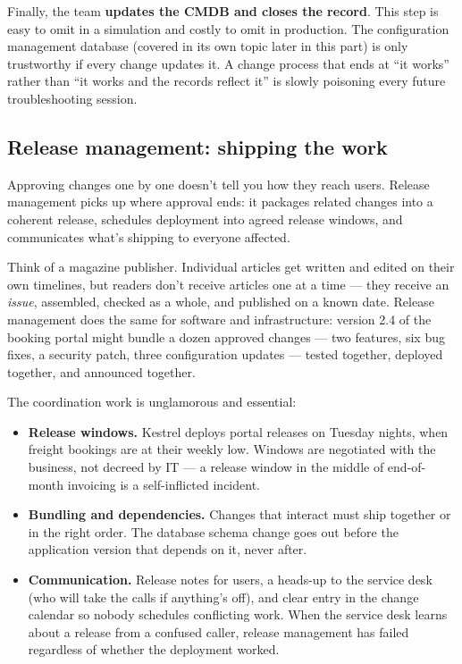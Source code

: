 Finally, the team \textbf{updates the CMDB and closes the record}. This step is easy to omit in a simulation and costly to omit in production. The configuration management database (covered in its own topic later in this part) is only trustworthy if every change updates it. A change process that ends at ``it works'' rather than ``it works and the records reflect it'' is slowly poisoning every future troubleshooting session.



\subsection{Release management: shipping the work}


Approving changes one by one doesn't tell you how they reach users. Release management picks up where approval ends: it packages related changes into a coherent release, schedules deployment into agreed release windows, and communicates what's shipping to everyone affected.


Think of a magazine publisher. Individual articles get written and edited on their own timelines, but readers don't receive articles one at a time — they receive an \emph{issue}, assembled, checked as a whole, and published on a known date. Release management does the same for software and infrastructure: version 2.4 of the booking portal might bundle a dozen approved changes — two features, six bug fixes, a security patch, three configuration updates — tested together, deployed together, and announced together.


The coordination work is unglamorous and essential:


\begin{itemize}[leftmargin=*]
\item \textbf{Release windows.} Kestrel deploys portal releases on Tuesday nights, when freight bookings are at their weekly low. Windows are negotiated with the business, not decreed by IT — a release window in the middle of end-of-month invoicing is a self-inflicted incident.
\item \textbf{Bundling and dependencies.} Changes that interact must ship together or in the right order. The database schema change goes out before the application version that depends on it, never after.
\item \textbf{Communication.} Release notes for users, a heads-up to the service desk (who will take the calls if anything's off), and clear entry in the change calendar so nobody schedules conflicting work. When the service desk learns about a release from a confused caller, release management has failed regardless of whether the deployment worked.
\end{itemize}


